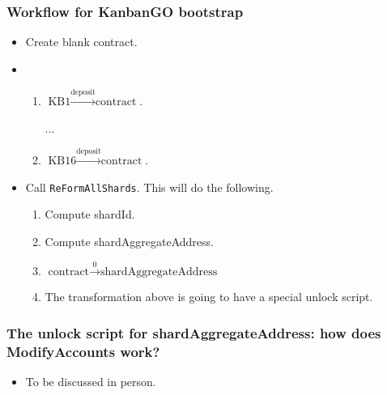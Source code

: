 \begin{frame}[fragile]
\frametitle{Workflow for KanbanGO bootstrap}

\begin{itemize}
\item Create blank contract.
\item \begin{enumerate}
	\item $\text{KB1} \stackrel{\text{deposit}}{\to} \text{contract}$.
	
	...
	
	\item $\text{KB16} \stackrel{\text{deposit}}{\to} \text{contract}$.
\end{enumerate}
\item Call \verb|ReFormAllShards|. This will do the following.
\begin{enumerate}
	\item Compute shardId.
	\item Compute shardAggregateAddress.
	\item $\text{contract} \stackrel{0}{\to}\text{shardAggregateAddress} $
	\item The transformation above is going to have a special unlock script.
\end{enumerate}
\end{itemize}

\end{frame}

\begin{frame}[fragile]
\frametitle{The unlock script for shardAggregateAddress: how does ModifyAccounts work?}
\begin{itemize}
	\item To be discussed in person.
\end{itemize}
\end{frame}